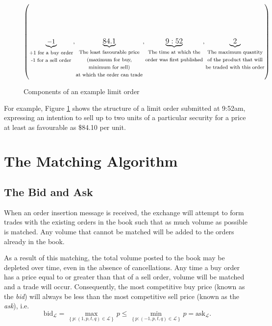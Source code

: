 \documentclass[honours,12pt]{unswthesis}
\numberwithin{equation}{section}
\begin{document}
\begin{figure}[h]
	$$\left(\underbrace{-1}_{\fontsize{8}{8}\begin{matrix} \text{+1 for a buy order}\\ \text{-1 for a sell order}\end{matrix}}\fontsize{12}{8},\underbrace{84.1}_{\fontsize{8}{8}\begin{matrix}\text{The least favourable price}\\\text{(maximum for buy,}\\\text{minimum for sell)}\\\text{at which the order can trade}\end{matrix}}\fontsize{12}{8},\underbrace{9:52}_{\fontsize{8}{8}\begin{matrix}\text{The time at which the}\\\text{order was first published}\end{matrix}}\fontsize{12}{8},\underbrace{2}_{\fontsize{8}{8}\begin{matrix}\text{The maximum quantity}\\\text{of the product that will}\\\text{be traded with this order}\end{matrix}}\right)$$
	\caption{Components of an example limit order}
	\label{fig:limitorder}
\end{figure}

For example, Figure \ref{fig:limitorder} shows the structure of a limit order submitted at 9:52am, expressing an intention to sell up to two units of a particular security for a price at least as favourable as \$84.10 per unit.

\newpage
\section{The Matching Algorithm}
\subsection{The Bid and Ask}
When an order insertion message is received, the exchange will attempt to form trades with the existing orders in the book such that as much volume as possible is matched. Any volume that cannot be matched will be added to the orders already in the book.

As a result of this matching, the total volume posted to the book may be depleted over time, even in the absence of cancellations. Any time a buy order has a price equal to or greater than that of a sell order, volume will be matched and a trade will occur. Consequently, the most competitive buy price (known as the \textit{bid}) will always be less than the most competitive sell price (known as the \textit{ask}), i.e.
	$$\text{bid}_\mathcal{L} = \max_{\left\{p : (1,p,t,q)\in\mathcal{L}\right\}} p \leq \min_{\left\{p : (-1,p,t,q)\in\mathcal{L}\right\}} p = \text{ask}_\mathcal{L}.$$
\end{document}
